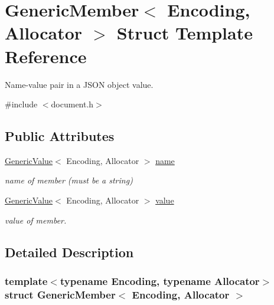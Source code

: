\hypertarget{structGenericMember}{}\section{Generic\+Member$<$ Encoding, Allocator $>$ Struct Template Reference}
\label{structGenericMember}


Name-\/value pair in a J\+S\+ON object value.  




{\ttfamily \#include $<$document.\+h$>$}

\subsection*{Public Attributes}
\begin{DoxyCompactItemize}
\item 
\mbox{\label{structGenericMember_afc92c7df16827ceeae02cdb47795d449}} 
\hyperlink{classGenericValue}{Generic\+Value}$<$ Encoding, Allocator $>$ \hyperlink{structGenericMember_afc92c7df16827ceeae02cdb47795d449}{name}
\begin{DoxyCompactList}\small\item\em name of member (must be a string) \end{DoxyCompactList}\item 
\mbox{\label{structGenericMember_a375b5e080286b6898e43d04e9eae30d2}} 
\hyperlink{classGenericValue}{Generic\+Value}$<$ Encoding, Allocator $>$ \hyperlink{structGenericMember_a375b5e080286b6898e43d04e9eae30d2}{value}
\begin{DoxyCompactList}\small\item\em value of member. \end{DoxyCompactList}\end{DoxyCompactItemize}


\subsection{Detailed Description}
\subsubsection*{template$<$typename Encoding, typename Allocator$>$\newline
struct Generic\+Member$<$ Encoding, Allocator $>$}

